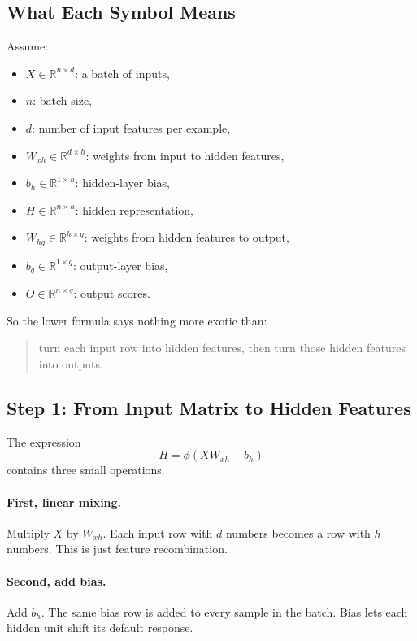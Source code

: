 \documentclass[12pt,a4paper]{article}
\begin{document}
\subsection{What Each Symbol Means}

Assume:
\begin{itemize}
  \item \(X \in \mathbb{R}^{n \times d}\): a batch of inputs,
  \item \(n\): batch size,
  \item \(d\): number of input features per example,
  \item \(W_{xh} \in \mathbb{R}^{d \times h}\): weights from input to hidden features,
  \item \(b_h \in \mathbb{R}^{1 \times h}\): hidden-layer bias,
  \item \(H \in \mathbb{R}^{n \times h}\): hidden representation,
  \item \(W_{hq} \in \mathbb{R}^{h \times q}\): weights from hidden features to output,
  \item \(b_q \in \mathbb{R}^{1 \times q}\): output-layer bias,
  \item \(O \in \mathbb{R}^{n \times q}\): output scores.
\end{itemize}

So the lower formula says nothing more exotic than:
\begin{quote}
turn each input row into hidden features, then turn those hidden features into outputs.
\end{quote}

\subsection{Step 1: From Input Matrix to Hidden Features}

The expression
\[
H = \phi(XW_{xh} + b_h)
\]
contains three small operations.

\paragraph{First, linear mixing.}
Multiply \(X\) by \(W_{xh}\). Each input row with \(d\) numbers becomes a row with \(h\) numbers. This is just feature recombination.

\paragraph{Second, add bias.}
Add \(b_h\). The same bias row is added to every sample in the batch. Bias lets each hidden unit shift its default response.
\end{document}
